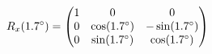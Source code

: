 \documentclass[preview]{standalone}
\begin{document}
\begin{align*}
\special{dvisvgm:raw <g id='unique000'>}R_x(1.7^\circ) = \begin{pmatrix} 1 & 0 & 0 \\ 0 & \cos(1.7^\circ) & -\sin(1.7^\circ) \\ 0 & \sin(1.7^\circ) & \cos(1.7^\circ) \end{pmatrix}\special{dvisvgm:raw </g>}
\end{align*}
\end{document}
